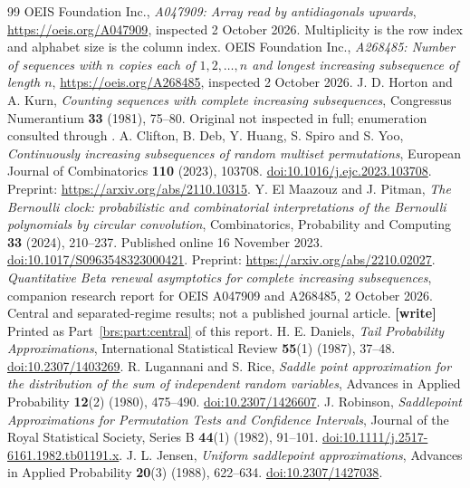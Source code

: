\documentclass[11pt]{article}
\newcommand{\parthead}{Front matter}
\numberwithin{equation}{section}
\theoremstyle{remark}\newtheorem{remark}[theorem]{Remark}
\begin{document}
\clearpage
\renewcommand{\parthead}{References}
\begin{thebibliography}{99}
 OEIS Foundation Inc., \emph{A047909: Array read by
antidiagonals upwards}, \url{https://oeis.org/A047909}, inspected
2 October 2026.  Multiplicity is the row index and alphabet size is the
column index.
 OEIS Foundation Inc., \emph{A268485: Number of sequences
with $n$ copies each of $1,2,\ldots,n$ and longest increasing subsequence
of length $n$}, \url{https://oeis.org/A268485}, inspected 2 October 2026.
 J. D. Horton and A. Kurn, \emph{Counting sequences with
complete increasing subsequences}, Congressus Numerantium \textbf{33}
(1981), 75--80.  Original not inspected in full; enumeration consulted
through \cite[Theorem 2.1]{clifton}.
 A. Clifton, B. Deb, Y. Huang, S. Spiro and S. Yoo,
\emph{Continuously increasing subsequences of random multiset
permutations}, European Journal of Combinatorics \textbf{110} (2023),
103708.  \href{https://doi.org/10.1016/j.ejc.2023.103708}{doi:10.1016/j.ejc.2023.103708}.
Preprint: \url{https://arxiv.org/abs/2110.10315}.
 Y. El Maazouz and J. Pitman, \emph{The Bernoulli clock:
probabilistic and combinatorial interpretations of the Bernoulli
polynomials by circular convolution}, Combinatorics, Probability and
Computing \textbf{33} (2024), 210--237.  Published online 16 November 2023.
\href{https://doi.org/10.1017/S0963548323000421}{doi:10.1017/S0963548323000421}.
Preprint: \url{https://arxiv.org/abs/2210.02027}.
 \emph{Quantitative Beta renewal asymptotics for complete
increasing subsequences}, companion research report for OEIS A047909
and A268485, 2 October 2026.  Central and separated-regime results;
not a published journal article.  \textbf{[write]} Printed as Part~\ref{brs:part:central} of this report.
 H. E. Daniels, \emph{Tail Probability Approximations},
International Statistical Review \textbf{55}(1) (1987), 37--48.
\href{https://doi.org/10.2307/1403269}{doi:10.2307/1403269}.
 R. Lugannani and S. Rice, \emph{Saddle point approximation
for the distribution of the sum of independent random variables},
Advances in Applied Probability \textbf{12}(2) (1980), 475--490.
\href{https://doi.org/10.2307/1426607}{doi:10.2307/1426607}.
 J. Robinson, \emph{Saddlepoint Approximations for
Permutation Tests and Confidence Intervals}, Journal of the Royal
Statistical Society, Series B \textbf{44}(1) (1982), 91--101.
\href{https://doi.org/10.1111/j.2517-6161.1982.tb01191.x}{doi:10.1111/j.2517-6161.1982.tb01191.x}.
 J. L. Jensen, \emph{Uniform saddlepoint approximations},
Advances in Applied Probability \textbf{20}(3) (1988), 622--634.
\href{https://doi.org/10.2307/1427038}{doi:10.2307/1427038}.
\end{thebibliography}
\end{document}
